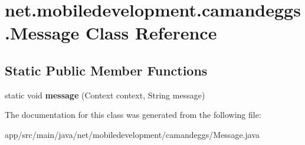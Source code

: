 \hypertarget{classnet_1_1mobiledevelopment_1_1camandeggs_1_1_message}{}\section{net.\+mobiledevelopment.\+camandeggs.\+Message Class Reference}
\label{classnet_1_1mobiledevelopment_1_1camandeggs_1_1_message}
\subsection*{Static Public Member Functions}
\begin{DoxyCompactItemize}
\item 
\mbox{\label{classnet_1_1mobiledevelopment_1_1camandeggs_1_1_message_a4747588bc5300eda5350425cf9114151}} 
static void {\bfseries message} (Context context, String message)
\end{DoxyCompactItemize}


The documentation for this class was generated from the following file\+:\begin{DoxyCompactItemize}
\item 
app/src/main/java/net/mobiledevelopment/camandeggs/Message.\+java\end{DoxyCompactItemize}
